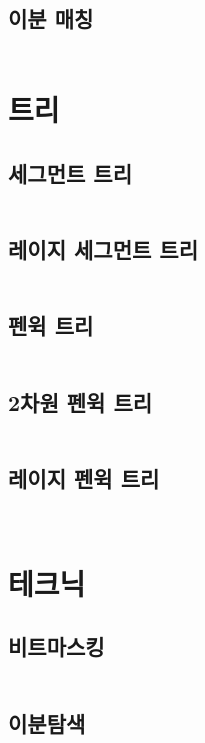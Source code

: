 \documentclass{article}
\begin{document}
\begin{multicols}{2}
\subsection{이분 매칭}
\inputminted[linenos, breaklines]{python}{codes/bimatch.py}

\section{트리}
\subsection{세그먼트 트리}
\inputminted[linenos, breaklines]{cpp}{codes/segtree.cpp}
\subsection{레이지 세그먼트 트리}
\inputminted[linenos, breaklines]{cpp}{codes/lazyseg.cpp}
\subsection{펜윅 트리}
\inputminted[linenos, breaklines]{python}{codes/fenwick.py}
\subsection{2차원 펜윅 트리}
\inputminted[linenos, breaklines]{python}{codes/fenwick2d.py}
\subsection{레이지 펜윅 트리}
\inputminted[linenos, breaklines]{cpp}{codes/lazyfenwick.cpp}
\inputminted[linenos, breaklines]{python}{codes/lazyfenwick.py}
\section{테크닉}
\subsection{비트마스킹}
\inputminted[linenos, breaklines]{python}{codes/bit.py}
\subsection{이분탐색}
\inputminted[linenos, breaklines]{python}{codes/bisect.py}


\end{multicols}
%
\end{document}
